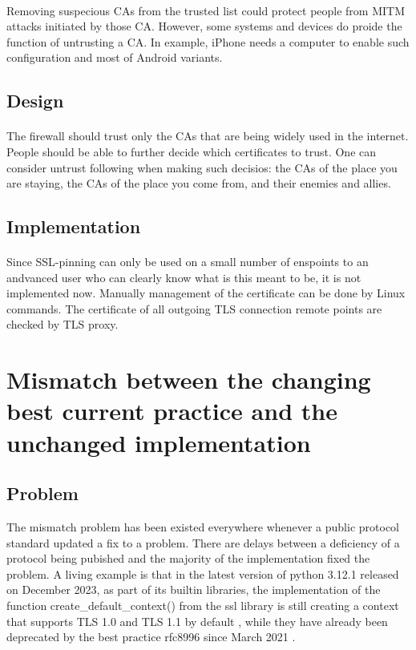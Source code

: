 \documentclass[mscthesis]{usiinfthesis}
\begin{document}
\paragraph{}
Removing suspecious CAs from the trusted list could protect people from MITM attacks initiated by those CA. However, some systems and devices do proide the function of untrusting a CA. In example, iPhone needs a computer to enable such configuration and most of Android variants.
\subsection{Design}
\paragraph{}
The firewall should trust only the CAs that are being widely used in the internet. People should be able to further decide which certificates to trust. One can consider untrust following when making such decisios: the CAs of the place you are staying, the CAs of the place you come from, and their enemies and allies.
\subsection{Implementation}
\paragraph{}
Since SSL-pinning can only be used on a small number of enspoints to an andvanced user who can clearly know what is this meant to be, it is not implemented now. Manually management of the certificate can be done by Linux commands. The certificate of all outgoing TLS connection remote points are checked by TLS proxy.

\section{Mismatch between the changing best current practice and the unchanged implementation}
\subsection{Problem}
The mismatch problem has been existed everywhere whenever a public protocol standard updated a fix to a problem. There are delays between a deficiency of a protocol being pubished and the majority of the implementation fixed the problem. A living example is that in the latest version of python 3.12.1 released on December 2023, as part of its builtin libraries, the implementation of the function create\_default\_context() from the ssl library is still creating a context that supports TLS 1.0 and TLS 1.1 by default \citep{pyton:ssl}, while they have already been deprecated by the best practice rfc8996 since March 2021 \citep{rfc:notls11}.
\end{document}

